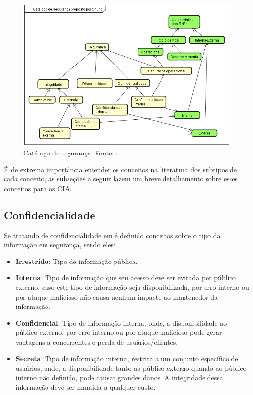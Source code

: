 \begin{figure}[h!]
	\centering
	\includegraphics[keepaspectratio=true,scale=0.9]{figuras/catalogoSegurancaChung.PNG}
	\caption{Catálogo de segurança. Fonte: \cite{chung2012non}.}
	\label{catalogoSegurancaChung}
\end{figure}

É de extrema importância entender os conceitos na literatura dos subtipos de cada conceito, as subseções a seguir fazem um breve detalhamento sobre esses conceitos para os CIA. 

\subsection{Confidencialidade}

Se tratando de confidencialidade em \cite{reis10classificaccao} é definido conceitos sobre o tipo da informação em segurança, sendo eles: 

\begin{itemize}
	\item \textbf{Irrestrido}: Tipo de informação pública. 
	
	\item \textbf{Interna}: Tipo de informação que seu acesso deve ser evitada por público externo, caso este tipo de informação seja disponibilizada, por erro interno ou por ataque malicioso não causa nenhum impacto ao mantenedor da informação.
	
	\item \textbf{Confidencial}: Tipo de informação interna, onde, a disponibilidade ao público externo, por erro interno ou por ataque malicioso pode gerar vantagens a concorrentes e perda de usuários/clientes. 
	
	\item \textbf{Secreta}: Tipo de informação interna, restrita a um conjunto específico de usuários, onde, a disponibilidade tanto ao público externo quando ao público interno não definido, pode causar grandes danos. A integridade dessa informação deve ser mantida a qualquer custo.
\end{itemize} 

